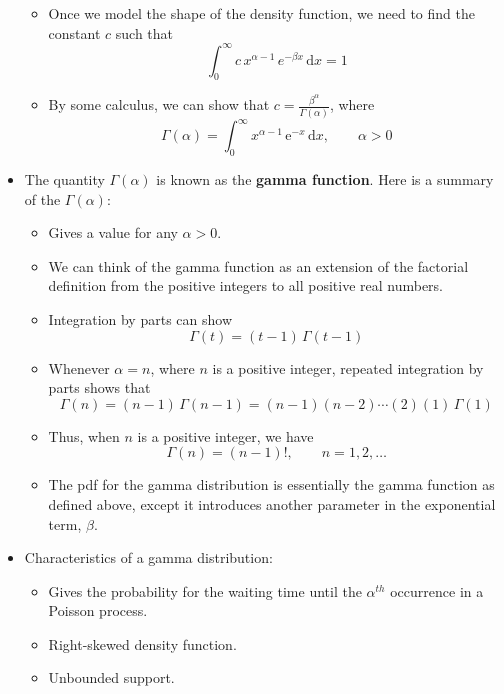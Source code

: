 \documentclass{article}
\newcommand{\integral}[4]{\displaystyle \int_{#1}^{#2} #3 \,\mathrm{d} #4}		%
\newcommand{\e}{\mathrm{e}}		%
\newcommand{\gam}[1]{\Gamma(#1)}		%
\begin{document}
\begin{itemize}
\begin{itemize}
        \item Once we model the shape of the density function, we need to find the constant $c$ such that
        \[\integral{0}{\infty}{c \, x^{\alpha - 1} \, e^{-\beta x}}{x} = 1\]
        \item[] By some calculus, we can show that $c = \frac{\beta^\alpha}{\gam{\alpha}}$, where \[\gam{\alpha} = \integral{0}{\infty}{x^{\alpha - 1}\, \e^{-x}}{x}, \quad\quad \alpha > 0\]
    \end{itemize}
    \item The quantity $\gam{\alpha}$ is known as the \textbf{gamma function}. Here is a summary of the $\gam{\alpha}$:
    \begin{itemize}
        \item Gives a value for any $\alpha > 0$. 
        \item We can think of the gamma function as an extension of the factorial definition from the positive integers to all positive real numbers.
        \item[] Integration by parts can show
        \[\gam{t} = (t - 1) \, \gam{t - 1}\]
        \item Whenever $\alpha = n$, where $n$ is a positive integer, repeated integration by parts shows that
        \[\gam{n} = (n - 1) \, \gam{n - 1} = (n - 1) (n - 2) \cdots (2) (1) \, \gam{1}\]
        \vspace{30pt}
        \item[] Thus, when $n$ is a positive integer, we have
        \[\gam{n} = (n - 1)!, \quad\quad n = 1, 2, \ldots\]
        \item The pdf for the gamma distribution is essentially the gamma function as defined above, except it introduces another parameter in the exponential term, $\beta$.\bigskip
    \end{itemize}
    \item Characteristics of a gamma distribution:
    \begin{itemize}
        \item Gives the probability for the waiting time until the $\alpha^{th}$ occurrence in a  Poisson process.
        \item Right-skewed density function.
        \item Unbounded support.
        
        \newpage
        

\end{itemize}
\end{itemize}
\end{document}
